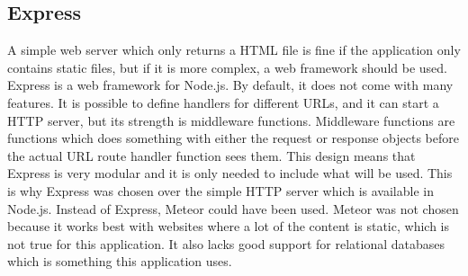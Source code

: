 \subsection{Express}
A simple web server which only returns a HTML file is fine if the application only contains static files, but if it is more complex, a web framework should be used. Express\cite{express} is a web framework for Node.js. By default, it does not come with many features. It is possible to define handlers for different URLs, and it can start a HTTP server, but its strength is middleware functions. Middleware functions are functions which does something with either the request or response objects before the actual URL route handler function sees them. This design means that Express is very modular and it is only needed to include what will be used. This is why Express was chosen over the simple HTTP server which is available in Node.js. Instead of Express, Meteor\cite{meteor} could have been used. Meteor was not chosen because it works best with websites where a lot of the content is static, which is not true for this application. It also lacks good support for relational databases which is something this application uses.